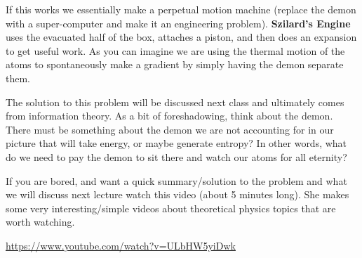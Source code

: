 \documentclass{article}
\begin{document}
If this works we essentially make a perpetual motion machine (replace the demon with a super-computer and make it an engineering problem). 
\textbf{Szilard's Engine} uses the evacuated half of the box, attaches a piston, and then does an expansion to get useful work. 
As you can imagine we are using the thermal motion of the atoms to spontaneously make a gradient by simply having the demon separate them. 

The solution to this problem will be discussed next class and ultimately comes from information theory. 
As a bit of foreshadowing, think about the demon.
There must be something about the demon we are not accounting for in our picture that will take energy, or maybe generate entropy?
In other words, what do we need to pay the demon to sit there and watch our atoms for all eternity?

If you are bored, and want a quick summary/solution to the problem and what we will discuss next lecture watch this video (about 5 minutes long). 
She makes some very interesting/simple videos about theoretical physics topics that are worth watching. 

\url{https://www.youtube.com/watch?v=ULbHW5yiDwk}
\end{document}
